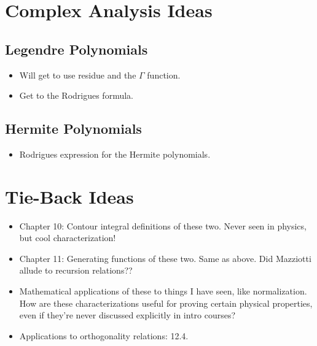 \documentclass[../finalProject.tex]{subfiles}
\begin{document}
\section*{Complex Analysis Ideas}
\subsection*{Legendre Polynomials}
\begin{itemize}
    \item Will get to use residue and the $\Gamma$ function.
    \item Get to the Rodrigues formula.
\end{itemize}


\subsection*{Hermite Polynomials}
\begin{itemize}
    \item Rodrigues expression for the Hermite polynomials.
\end{itemize}



\section*{Tie-Back Ideas}
\begin{itemize}
    \item Chapter 10: Contour integral definitions of these two. Never seen in physics, but cool characterization!
    \item Chapter 11: Generating functions of these two. Same as above. Did Mazziotti allude to recursion relations??
    \item Mathematical applications of these to things I have seen, like normalization. How are these characterizations useful for proving certain physical properties, even if they're never discussed explicitly in intro courses?
    \item Applications to orthogonality relations: 12.4.
\end{itemize}
\newpage



\printbibliography
\end{document}
